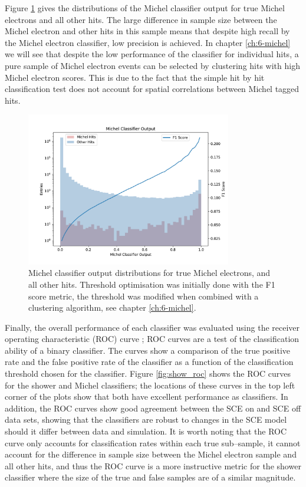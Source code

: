 Figure \ref{fig:michel_output} gives the distributions of the Michel classifier
output for true Michel electrons and all other hits. The large difference in
sample size between the Michel electron and other hits in this sample means that
despite high recall by the Michel electron classifier, low precision is
achieved. In chapter \ref{ch:6-michel} we will see that despite the low
performance of the classifier for individual hits, a pure sample of Michel
electron events can be selected by clustering hits with high Michel electron
scores. This is due to the fact that the simple hit by hit classification test
does not account for spatial correlations between Michel tagged hits.

\begin{figure}[h]
	\centering
	\includegraphics[width=0.8\textwidth]{figures/michel_combined.pdf} 
	\caption[Michel classifier output distributions.]{Michel classifier output
	distributions for true Michel electrons, and all other hits. Threshold
	optimisation was initially done with the F1 score metric, the threshold was
	modified when combined with a clustering algorithm, see chapter
	\ref{ch:6-michel}.}
	\label{fig:michel_output}
\end{figure}

Finally, the overall performance of each classifier was evaluated using the
receiver operating characteristic (ROC) curve \cite{Fawcett2006}; ROC curves are
a test of the classification ability of a binary classifier. The curves show a
comparison of the true positive rate and the false positive rate of the
classifier as a function of the classification threshold chosen for the
classifier. Figure \ref{fig:show_roc} shows the ROC curves for the shower and
Michel classifiers; the locations of these curves in the top left corner of the
plots show that both have excellent performance as classifiers. In addition, the
ROC curves show good agreement between the SCE on and SCE off data sets, showing
that the classifiers are robust to changes in the SCE model should it differ
between data and simulation. It is worth noting that the ROC curve only accounts
for classification rates within each true sub--sample, it cannot account for the
difference in sample size between the Michel electron sample and all other hits,
and thus the ROC curve is a more instructive metric for the shower classifier
where the size of the true and false samples are of a similar magnitude.

